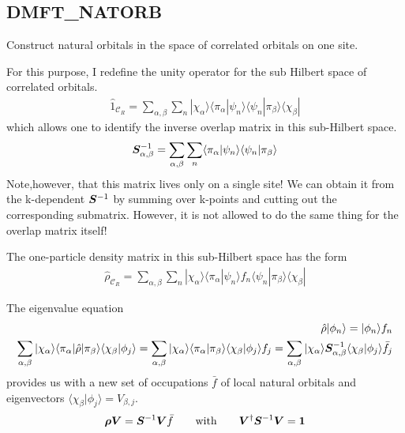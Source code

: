 \documentclass[11pt,a4paper]{report}
\begin{document}
\subsection{DMFT\_NATORB}
\label{sec:routinedmftnatorb}
Construct natural orbitals in the space of correlated orbitals on one
site.

For this purpose, I redefine the unity operator for the sub Hilbert
space of correlated orbitals.
\begin{eqnarray}
\hat{1}_{\mathcal{C}_R}
=\sum_{\alpha,\beta}\sum_n
|\chi_\alpha\rangle
\langle\pi_\alpha|\psi_n\rangle\langle\psi_n|\pi_\beta\rangle
\langle\chi_\beta|
\end{eqnarray}
which allows one to identify the inverse overlap matrix in this sub-Hilbert space.
\begin{eqnarray}
\bm{S}^{-1}_{\alpha,\beta}
=\sum_{\alpha,\beta}\sum_n
\langle\pi_\alpha|\psi_n\rangle\langle\psi_n|\pi_\beta\rangle
\end{eqnarray}
Note,however, that this matrix lives only on a single site! We can
obtain it from the k-dependent $\bm{S}^{-1}$ by summing over k-points
and cutting out the corresponding submatrix. However, it is not
allowed to do the same thing for the overlap matrix itself!

The one-particle density matrix in this sub-Hilbert space has the form
\begin{eqnarray}
\hat{\rho}_{\mathcal{C}_R}
=\sum_{\alpha,\beta}\sum_n
|\chi_\alpha\rangle
\langle\pi_\alpha|\psi_n\rangle f_n \langle\psi_n|\pi_\beta\rangle
\langle\chi_\beta|
\end{eqnarray}

The eigenvalue equation
\begin{eqnarray}
\hat{\rho}|\phi_n\rangle=|\phi_n\rangle f_n
\nonumber\\
\sum_{\alpha,\beta}|\chi_\alpha\rangle
\langle\pi_\alpha|\hat{\rho}|\pi_\beta\rangle\langle\chi_\beta|\phi_j\rangle
=\sum_{\alpha,\beta}|\chi_\alpha\rangle\langle\pi_\alpha|\pi_\beta\rangle
\langle\chi_\beta|\phi_j\rangle f_j
=\sum_{\alpha,\beta}|\chi_\alpha\rangle
\bm{S}^{-1}_{\alpha,\beta}\langle\chi_\beta|\phi_j\rangle \bar{f}_j
\end{eqnarray}
provides us with a new set of occupations $\bar{f}$ of local natural
orbitals and eigenvectors
$\langle\chi_\beta|\phi_j\rangle=V_{\beta,j}$.
\begin{eqnarray}
\bm{\rho}\bm{V}=\bm{S}^{-1}\bm{V}\bar{f}
\qquad\text{with}\qquad
\bm{V}^\dagger\bm{S}^{-1}\bm{V}=\bm{1}
\end{eqnarray}
\end{document}
